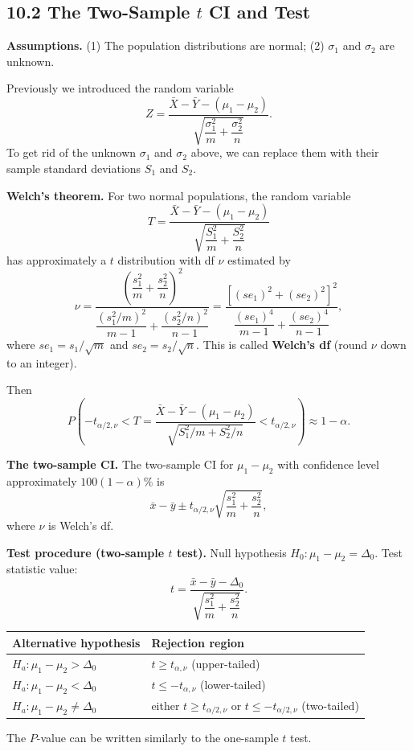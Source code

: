 \subsection*{10.2 The Two-Sample $t$ CI and Test}

\textbf{Assumptions.} (1) The population distributions are normal; (2) $\sigma_1$ and $\sigma_2$ are unknown.

Previously we introduced the random variable
\[
Z = \frac{\bar{X}-\bar{Y}-(\mu_1-\mu_2)}{\sqrt{\dfrac{\sigma_1^2}{m}+\dfrac{\sigma_2^2}{n}}}.
\]
To get rid of the unknown $\sigma_1$ and $\sigma_2$ above, we can replace them with their sample standard deviations $S_1$ and $S_2$.

\textbf{Welch's theorem.} For two normal populations, the random variable
\[
T = \frac{\bar{X}-\bar{Y}-(\mu_1-\mu_2)}{\sqrt{\dfrac{S_1^2}{m}+\dfrac{S_2^2}{n}}}
\]
has approximately a $t$ distribution with df $\nu$ estimated by
\[
\nu = \frac{\left(\dfrac{s_1^2}{m}+\dfrac{s_2^2}{n}\right)^2}{\dfrac{(s_1^2/m)^2}{m-1}+\dfrac{(s_2^2/n)^2}{n-1}}
    = \frac{\left[(se_1)^2+(se_2)^2\right]^2}{\dfrac{(se_1)^4}{m-1}+\dfrac{(se_2)^4}{n-1}},
\]
where $se_1=s_1/\sqrt{m}$ and $se_2=s_2/\sqrt{n}$. This is called \textbf{Welch's df} (round $\nu$ down to an integer).

Then
\[
P\!\left(-t_{\alpha/2,\nu} < T = \frac{\bar{X}-\bar{Y}-(\mu_1-\mu_2)}{\sqrt{S_1^2/m+S_2^2/n}} < t_{\alpha/2,\nu}\right) \approx 1-\alpha .
\]

\textbf{The two-sample CI.} The two-sample CI for $\mu_1-\mu_2$ with confidence level approximately $100(1-\alpha)\%$ is
\[
\bar{x}-\bar{y} \pm t_{\alpha/2,\nu}\sqrt{\frac{s_1^2}{m}+\frac{s_2^2}{n}},
\]
where $\nu$ is Welch's df.

\textbf{Test procedure (two-sample $t$ test).} Null hypothesis $H_0:\mu_1-\mu_2=\Delta_0$. Test statistic value:
\[
t = \frac{\bar{x}-\bar{y}-\Delta_0}{\sqrt{\dfrac{s_1^2}{m}+\dfrac{s_2^2}{n}}}.
\]

\begin{center}
\begin{tabular}{ll}
\toprule
Alternative hypothesis & Rejection region\\
\midrule
$H_a:\mu_1-\mu_2>\Delta_0$   & $t\ge t_{\alpha,\nu}$ (upper-tailed)\\
$H_a:\mu_1-\mu_2<\Delta_0$   & $t\le -t_{\alpha,\nu}$ (lower-tailed)\\
$H_a:\mu_1-\mu_2\ne\Delta_0$ & either $t\ge t_{\alpha/2,\nu}$ or $t\le -t_{\alpha/2,\nu}$ (two-tailed)\\
\bottomrule
\end{tabular}
\end{center}
The $P$-value can be written similarly to the one-sample $t$ test.


